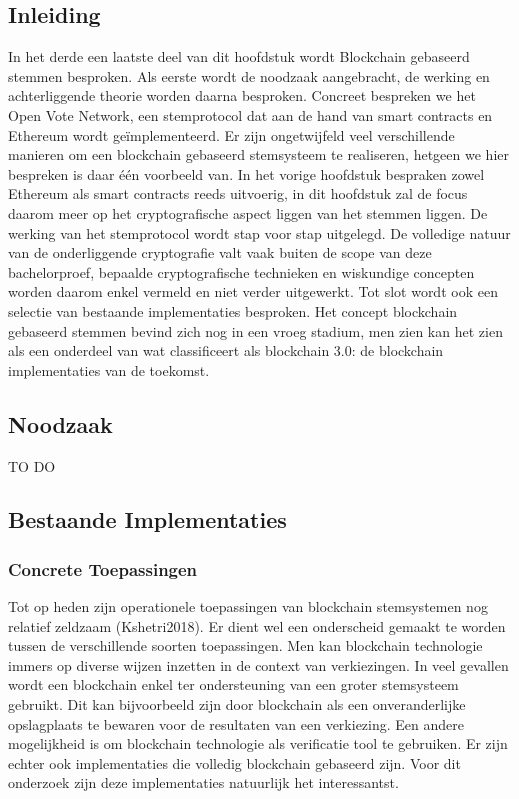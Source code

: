 	\subsection*{Inleiding}
			In het derde een laatste deel van dit hoofdstuk wordt Blockchain gebaseerd stemmen besproken.  Als eerste wordt de noodzaak aangebracht, de werking en achterliggende theorie worden daarna besproken. Concreet bespreken we het Open Vote Network, een stemprotocol dat  aan de hand van smart contracts en Ethereum wordt geïmplementeerd.  Er zijn ongetwijfeld veel verschillende manieren om een blockchain gebaseerd stemsysteem te realiseren,  hetgeen we hier bespreken is daar één voorbeeld van. In het vorige hoofdstuk bespraken zowel Ethereum als smart contracts reeds uitvoerig, in dit hoofdstuk zal de focus daarom meer op het cryptografische aspect liggen van het stemmen liggen. De werking van het stemprotocol wordt stap voor stap uitgelegd. De volledige natuur van de onderliggende cryptografie valt vaak buiten de scope van deze bachelorproef, bepaalde cryptografische technieken en wiskundige concepten worden daarom enkel vermeld en niet verder uitgewerkt. Tot slot wordt ook een selectie van bestaande implementaties besproken.
			Het concept blockchain gebaseerd stemmen bevind zich nog in een vroeg stadium, men zien kan het zien als een onderdeel van wat \textcite{Swan2015} classificeert als blockchain 3.0: de blockchain implementaties van de toekomst.
	\subsection{Noodzaak}
			TO DO
	\subsection{Bestaande Implementaties}
			\subsubsection{Concrete Toepassingen}
			Tot op heden zijn operationele toepassingen van blockchain stemsystemen nog relatief zeldzaam (Kshetri2018).  Er dient wel  een onderscheid gemaakt te worden tussen de verschillende soorten toepassingen. Men kan  blockchain technologie immers op diverse wijzen inzetten in de context van verkiezingen. In veel gevallen wordt een blockchain enkel ter ondersteuning van een groter stemsysteem gebruikt. Dit kan bijvoorbeeld zijn door blockchain als  een onveranderlijke opslagplaats te bewaren voor de resultaten van een verkiezing. Een andere mogelijkheid is om blockchain technologie als verificatie tool te gebruiken. Er zijn echter ook implementaties die volledig blockchain gebaseerd zijn. Voor dit onderzoek zijn deze implementaties natuurlijk het interessantst.
			
